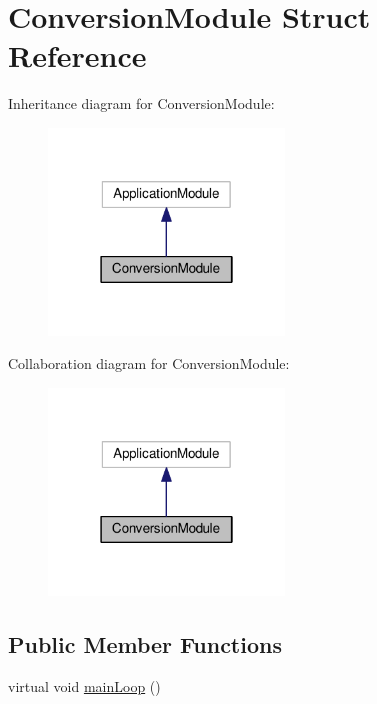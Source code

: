 \hypertarget{structConversionModule}{}\section{Conversion\+Module Struct Reference}
\label{structConversionModule}


Inheritance diagram for Conversion\+Module\+:
\nopagebreak
\begin{figure}[H]
\begin{center}
\leavevmode
\includegraphics[width=178pt]{structConversionModule__inherit__graph}
\end{center}
\end{figure}


Collaboration diagram for Conversion\+Module\+:
\nopagebreak
\begin{figure}[H]
\begin{center}
\leavevmode
\includegraphics[width=178pt]{structConversionModule__coll__graph}
\end{center}
\end{figure}
\subsection*{Public Member Functions}
\begin{DoxyCompactItemize}
\item 
virtual void \hyperlink{structConversionModule_a4e1fb1be4a9af32b11df5135bec98bfe}{main\+Loop} ()
\end{DoxyCompactItemize}
